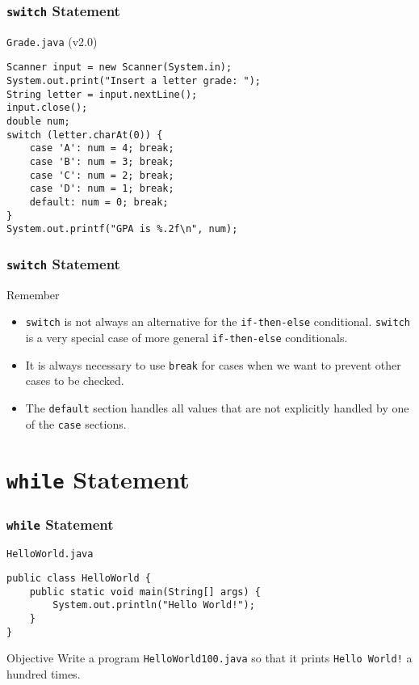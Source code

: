 \documentclass[10pt, compress]{beamer}
\begin{document}
\begin{frame}[fragile]
	\frametitle{\texttt{switch} Statement}
	\begin{block}{\texttt{Grade.java} (v2.0)}
		\begin{verbatim}
Scanner input = new Scanner(System.in);
System.out.print("Insert a letter grade: ");
String letter = input.nextLine();
input.close();
double num;
switch (letter.charAt(0)) {
	case 'A': num = 4; break;
	case 'B': num = 3; break;
	case 'C': num = 2; break;
	case 'D': num = 1; break;
	default: num = 0; break;
}
System.out.printf("GPA is %.2f\n", num);
		\end{verbatim}
	\end{block}
\end{frame}

\begin{frame}[fragile]
	\frametitle{\texttt{switch} Statement}
	\begin{block}{Remember}
		\begin{itemize}
			\item[] \texttt{switch} is not always an alternative for the \texttt{if-then-else} conditional. \texttt{switch} is a very special case of more general \texttt{if-then-else} conditionals.
			\item[] It is always necessary to use \texttt{break} for cases when we want to prevent other cases to be checked.
			\item[] The \texttt{default} section handles all values that are not explicitly handled by one of the \texttt{case} sections.
		\end{itemize}
	\end{block}
\end{frame}


\section{\texttt{while} Statement}

\begin{frame}[fragile]
	\frametitle{\texttt{while} Statement}
	\begin{block}{\texttt{HelloWorld.java}}
		\begin{verbatim}
public class HelloWorld {
	public static void main(String[] args) {
		System.out.println("Hello World!");
	}
}
		\end{verbatim}
	\end{block}
	\begin{block}{Objective}
		Write a program \texttt{HelloWorld100.java} so that it prints \texttt{Hello World!} a hundred times.
	\end{block}
\end{frame}
\end{document}
